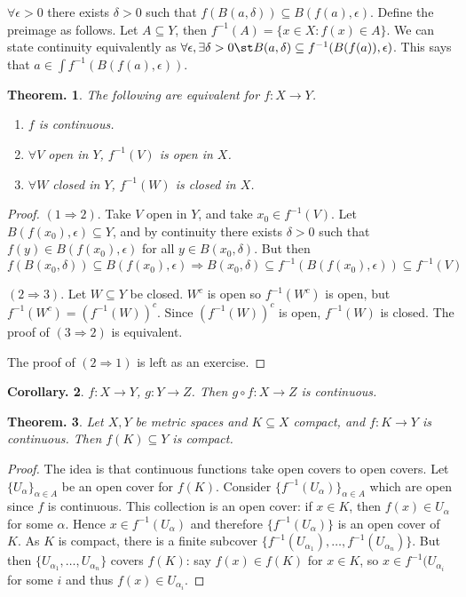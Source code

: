 \documentclass[11pt, a4paper]{memoir}
\theoremstyle{change}
\newtheorem{theorem}{Theorem.}[section]
\newtheorem{corollary}[theorem]{Corollary.}
\theoremstyle{plain}
\theoremstyle{nonumberplain}
\newtheorem{proof}{Proof}
\numberwithin{equation}{section}
\begin{document}
$\forall\epsilon>0$ there exists $\delta>0$ such that $f(B(a,\delta))\subseteq B(f(a),\epsilon)$. Define the preimage
as follows. Let $A\subseteq Y$, then $f^{-1}(A)=\{x\in X:f(x)\in A\}$. We can state continuity equivalently as
$\forall\epsilon,\exists\delta>0\st B(a,\delta)\subseteq f^{-1}(B(f(a)),\epsilon)$. This says that $a\in\int f^{-1}(B(f(a),\epsilon))$.
\begin{theorem}
    The following are equivalent for $f:X\to Y$.
    \begin{enumerate}
        \item $f$ is continuous.
        \item $\forall V$ open in $Y$, $f^{-1}(V)$ is open in $X$.
        \item $\forall W$ closed in $Y$, $f^{-1}(W)$ is closed in $X$.
    \end{enumerate}
\end{theorem}
\begin{proof}
    $(1\Rightarrow 2)$. Take $V$ open in $Y$, and take $x_0\in f^{-1}(V)$. Let $B(f(x_0),\epsilon)\subseteq Y$, and
    by continuity there exists $\delta>0$ such that $f(y)\in B(f(x_0),\epsilon)$ for all $y\in B(x_0,\delta)$. But then
    $f(B(x_0,\delta))\subseteq B(f(x_0),\epsilon)\Rightarrow B(x_0,\delta)\subseteq f^{-1}(B(f(x_0),\epsilon))\subseteq f^{-1}(V)$

    $(2\Rightarrow 3)$. Let $W\subseteq Y$ be closed. $W^c$ is open so $f^{-1}(W^c)$ is open, but $f^{-1}(W^c)=(f^{-1}(W))^c$.
    Since $(f^{-1}(W))^c$ is open, $f^{-1}(W)$ is closed. The proof of $(3\Rightarrow 2)$ is equivalent.

    The proof of $(2\Rightarrow 1)$ is left as an exercise.
\end{proof}
\begin{corollary}
    $f:X\to Y$, $g:Y\to Z$. Then $g\circ f:X\to Z$ is continuous.
\end{corollary}
\begin{theorem}
    Let $X,Y$ be metric spaces and $K\subseteq X$ compact, and $f:K\to Y$ is continuous. Then $f(K)\subseteq Y$ is compact.
\end{theorem}
\begin{proof}
    The idea is that continuous functions take open covers to open covers. Let $\{U_\alpha\}_{\alpha\in A}$ be an open
    cover for $f(K)$. Consider $\{f^{-1}(U_\alpha)\}_{\alpha\in A}$ which are open since $f$ is continuous. This collection
    is an open cover: if $x\in K$, then $f(x)\in U_\alpha$ for some $\alpha$. Hence $x\in f^{-1}(U_\alpha)$ and therefore
    $\{f^{-1}(U_\alpha)\}$ is an open cover of $K$. As $K$ is compact, there is a finite subcover $\{f^{-1}(U_{\alpha_1}),\ldots,f^{-1}(U_{\alpha_n})\}$.
    But then $\{U_{\alpha_1},\ldots,U_{\alpha_n}\}$ covers $f(K)$: say $f(x)\in f(K)$ for $x\in K$, so $x\in f^{-1}(U_{\alpha_i}$
    for some $i$ and thus $f(x)\in U_{\alpha_i}$.
\end{proof}
\end{document}
